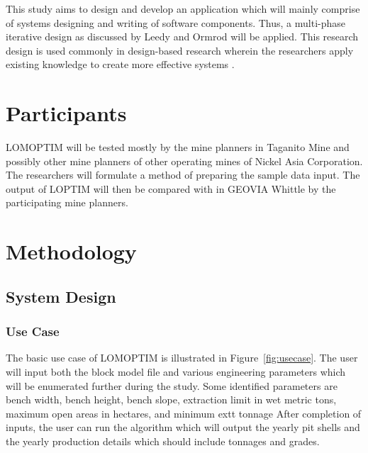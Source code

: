 \documentclass[12pt]{report}
\begin{document}
This study aims to design and develop an application which will mainly comprise of systems designing and writing of software components.
Thus, a multi-phase iterative design as discussed by Leedy and Ormrod will be applied.
This research design is used commonly in design-based research wherein the researchers apply existing knowledge to create more effective systems \cite{MixedMethod}.

\section{Participants}

LOMOPTIM will be tested mostly by the mine planners in Taganito Mine and possibly other mine planners of other operating mines of Nickel Asia Corporation.
The researchers will formulate a method of preparing the sample data input.
The output of LOPTIM will then be compared with in GEOVIA Whittle by the participating mine planners.

\section{Methodology}

\subsection{System Design}

\subsubsection{Use Case}

The basic use case \cite{usecase} of LOMOPTIM is illustrated in Figure~\ref{fig:usecase}.
The user will input both the block model file and various engineering parameters which will be enumerated further during the study.
Some identified parameters are bench width, bench height, bench slope, extraction limit in wet metric tons, maximum open areas in hectares, and minimum extt tonnage
After completion of inputs, the user can run the algorithm which will output the yearly pit shells and the yearly production details which should include tonnages and grades.
\end{document}
